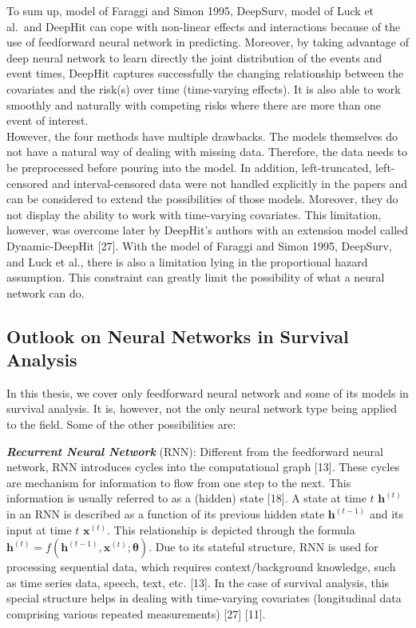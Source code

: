 \documentclass[
]{article}
\begin{document}
To sum up, model of Faraggi and Simon 1995, DeepSurv, model of Luck et al.~and DeepHit can cope with non-linear effects and interactions because of the use of feedforward neural network in predicting. Moreover, by taking advantage of deep neural network to learn directly the joint distribution of the events and event times, DeepHit captures successfully the changing relationship between the covariates and the risk(s) over time (time-varying effects). It is also able to work smoothly and naturally with competing risks where there are more than one event of interest.\\
However, the four methods have multiple drawbacks. The models themselves do not have a natural way of dealing with missing data. Therefore, the data needs to be preprocessed before pouring into the model. In addition, left-truncated, left-censored and interval-censored data were not handled explicitly in the papers and can be considered to extend the possibilities of those models. Moreover, they do not display the ability to work with time-varying covariates. This limitation, however, was overcome later by DeepHit's authors with an extension model called Dynamic-DeepHit {[}27{]}. With the model of Faraggi and Simon 1995, DeepSurv, and Luck et al., there is also a limitation lying in the proportional hazard assumption. This constraint can greatly limit the possibility of what a neural network can do.

\hypertarget{outlook-on-neural-networks-in-survival-analysis}{%
\subsection{Outlook on Neural Networks in Survival Analysis}\label{outlook-on-neural-networks-in-survival-analysis}}

In this thesis, we cover only feedforward neural network and some of its models in survival analysis. It is, however, not the only neural network type being applied to the field. Some of the other possibilities are:

\textbf{\emph{Recurrent Neural Network}} (RNN): Different from the feedforward neural network, RNN introduces cycles into the computational graph {[}13{]}. These cycles are mechanism for information to flow from one step to the next. This information is usually referred to as a (hidden) state {[}18{]}. A state at time \(t\) \(\mathbf{h}^{(t)}\) in an RNN is described as a function of its previous hidden state \(\mathbf{h}^{(t - 1)}\) and its input at time \(t\) \(\mathbf{x}^{(t)}\). This relationship is depicted through the formula \(\mathbf{h}^{(t)} = f(\mathbf{h}^{(t - 1)}, \mathbf{x}^{(t)}; \boldsymbol\theta)\). Due to its stateful structure, RNN is used for processing sequential data, which requires context/background knowledge, such as time series data, speech, text, etc. {[}13{]}. In the case of survival analysis, this special structure helps in dealing with time-varying covariates (longitudinal data comprising various repeated measurements) {[}27{]} {[}11{]}.
\end{document}
